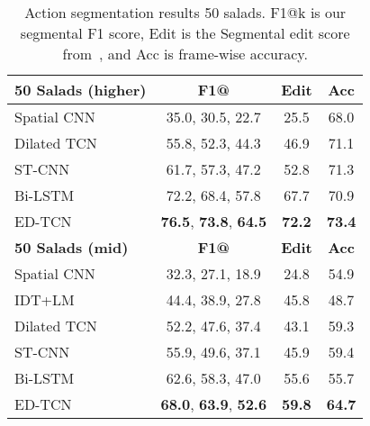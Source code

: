 \documentclass[10pt,twocolumn,letterpaper]{article}
\begin{document}
\begin{table}
\centering
\begin{tabular}{| l | c | c | c |}
			\hline
			\textbf{50 Salads (higher)} & \textbf{F1@} & \textbf{Edit} & \textbf{Acc} \\
			\hline
Spatial CNN~\cite{lea_eccv_2016} & 35.0, 30.5, 22.7 &  25.5  & 68.0 \\
            Dilated TCN & 55.8, 52.3, 44.3 & 46.9 & 71.1 \\
			ST-CNN~\cite{lea_eccv_2016} & 61.7, 57.3, 47.2 & 52.8 & 71.3 \\
			Bi-LSTM & 72.2, 68.4, 57.8 & 67.7 & 70.9 \\            
            
ED-TCN & \textbf{76.5}, \textbf{73.8}, \textbf{64.5} & \textbf{72.2} & \textbf{73.4}\\            
\hline
            \textbf{50 Salads (mid)} & \textbf{F1@} & \textbf{Edit} & \textbf{Acc} \\
            \hline
            Spatial CNN~\cite{lea_eccv_2016} & 32.3, 27.1, 18.9 & 24.8 & 54.9 \\
            IDT+LM~\cite{richard_cvpr_2016} & 44.4, 38.9, 27.8 & 45.8 & 48.7\\
            Dilated TCN  & 52.2, 47.6, 37.4 & 43.1 & 59.3 \\
ST-CNN \cite{lea_eccv_2016} & 55.9, 49.6, 37.1 & 45.9 & 59.4\\
            Bi-LSTM & 62.6, 58.3, 47.0 & 55.6 & 55.7 \\ 
ED-TCN & \textbf{68.0}, \textbf{63.9}, \textbf{52.6} & \textbf{59.8} & \textbf{64.7} \\
			\hline            
		\end{tabular}
        \label{tab:50salads}
        \caption{Action segmentation results 50 salads.
        F1@k is our segmental F1 score, Edit is the Segmental edit score from~\cite{lea_icra_2016}, and Acc is frame-wise accuracy. 
        }
\end{table}
\end{document}
